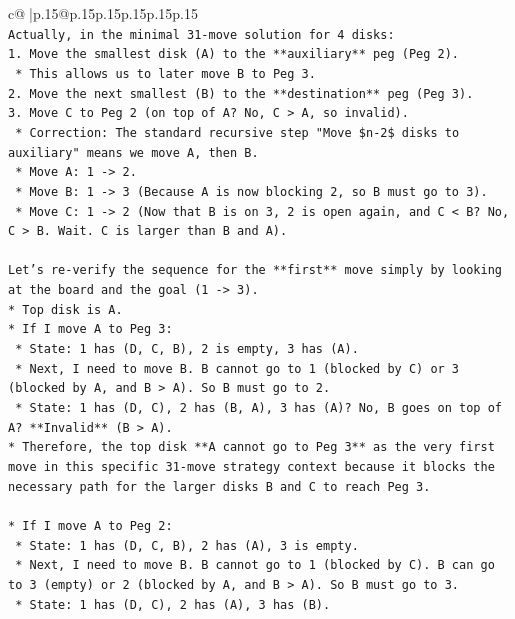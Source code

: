 \documentclass{article}
\begin{document}
{\begin{supertabular}{c@{$\;$}|p{.15\linewidth}@{}p{.15\linewidth}p{.15\linewidth}p{.15\linewidth}p{.15\linewidth}p{.15\linewidth}}
{{{\\ 
\texttt{Actually, in the minimal 31{-}move solution for 4 disks:} \\
\texttt{1.  Move the smallest disk (A) to the **auxiliary** peg (Peg 2).} \\
\texttt{    *   This allows us to later move B to Peg 3.} \\
\texttt{2.  Move the next smallest (B) to the **destination** peg (Peg 3).} \\
\texttt{3.  Move C to Peg 2 (on top of A? No, C > A, so invalid).} \\
\texttt{    *   Correction: The standard recursive step "Move \$n{-}2\$ disks to auxiliary" means we move A, then B.} \\
\texttt{    *   Move A: 1 {-}> 2.} \\
\texttt{    *   Move B: 1 {-}> 3 (Because A is now blocking 2, so B must go to 3).} \\
\texttt{    *   Move C: 1 {-}> 2 (Now that B is on 3, 2 is open again, and C < B? No, C > B. Wait. C is larger than B and A).} \\
\\ 
\texttt{Let's re{-}verify the sequence for the **first** move simply by looking at the board and the goal (1 {-}> 3).} \\
\texttt{*   Top disk is A.} \\
\texttt{*   If I move A to Peg 3:} \\
\texttt{    *   State: 1 has (D, C, B), 2 is empty, 3 has (A).} \\
\texttt{    *   Next, I need to move B. B cannot go to 1 (blocked by C) or 3 (blocked by A, and B > A). So B must go to 2.} \\
\texttt{    *   State: 1 has (D, C), 2 has (B, A), 3 has (A)? No, B goes on top of A? **Invalid** (B > A).} \\
\texttt{*   Therefore, the top disk **A cannot go to Peg 3** as the very first move in this specific 31{-}move strategy context because it blocks the necessary path for the larger disks B and C to reach Peg 3.} \\
\\ 
\texttt{*   If I move A to Peg 2:} \\
\texttt{    *   State: 1 has (D, C, B), 2 has (A), 3 is empty.} \\
\texttt{    *   Next, I need to move B. B cannot go to 1 (blocked by C). B can go to 3 (empty) or 2 (blocked by A, and B > A). So B must go to 3.} \\
\texttt{    *   State: 1 has (D, C), 2 has (A), 3 has (B).} \\
}}}
\end{supertabular}}
\end{document}
